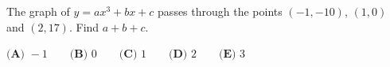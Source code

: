 The graph of $y=ax^3+bx+c$ passes through the points $(-1,-10)$, $(1,0)$ and $(2,17)$. Find $a+b+c$.

$\textbf{(A) }-1\qquad\textbf{(B) }0\qquad\textbf{(C) }1\qquad\textbf{(D) }2\qquad\textbf{(E) }3$
